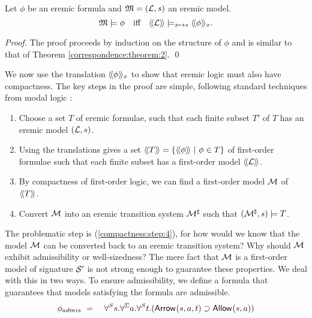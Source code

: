 \begin{theorem}\label{correspondence:theorem:2}
Let $\phi$ be an eremic formula and $\frak{M} = (\mathcal{L}, s)$ an eremic
model.
\[
   \frak{M} \models \phi \quad  \text{iff} \quad \langle\!\langle \mathcal{L} \rangle\!\rangle \models_{x \mapsto s} \langle\!\langle \phi \rangle\!\rangle_x.
\]
\end{theorem}
\begin{proof}
The proof proceeds by induction on the structure of $\phi$ and is
similar to that of Theorem \ref{correspondence:theorem:2}.  \qed
\end{proof}

\NI We now use the translation $\langle\!\langle \phi \rangle\!\rangle_x$ to show that eremic
logic must also have compactness. The key steps in the proof are
simple, following standard techniques from modal logic
\cite{BlackburnP:modlog}:

\begin{enumerate}

\item Choose a set $T$ of eremic formulae, such that each finite
  subset $T'$ of $T$ has an eremic model $(\mathcal{L}, s)$.

\item Using the translations gives a set $\langle\!\langle T \rangle\!\rangle =
  \{\langle\!\langle \phi \rangle\!\rangle\ |\ \phi \in T\}$ of first-order formulae such that
  each finite subset has a first-order model $\langle\!\langle \mathcal{L} \rangle\!\rangle$.

\item By compactness of first-order logic, we can find a first-order
  model $\mathcal{M}$ of $\langle\!\langle T \rangle\!\rangle$.

\item\label{compactness:step:4} Convert $\mathcal{M}$ into an eremic transition system
  $\mathcal{M}^{\sharp}$ such that $(\mathcal{M}^{\sharp}, s) \models T$.

\end{enumerate}

\NI The problematic step is (\ref{compactness:step:4}), for how would
we know that the model $\mathcal{M}$ can be converted back to an eremic
transition system? Why should $\mathcal{M}$ exhibit admissibility or
well-sizedness?  The mere fact that $\mathcal{M}$ is a first-order model
of signature $\mathcal{S}'$ is not strong enough to guarantee these
properties.  We deal with this in two ways. To ensure admissibility,
we define a formula that guarantees that models satisfying the formula
are admissible.
\begin{eqnarray*}
   \phi_{admis} 
      & \ =\ &
   \forall^{S} s.\forall^{\Sigma} a.\forall^{S} t.( \mathsf{Arrow}^{}(s, a, t) \supset \mathsf{Allow}^{}(s, a))
\end{eqnarray*}

